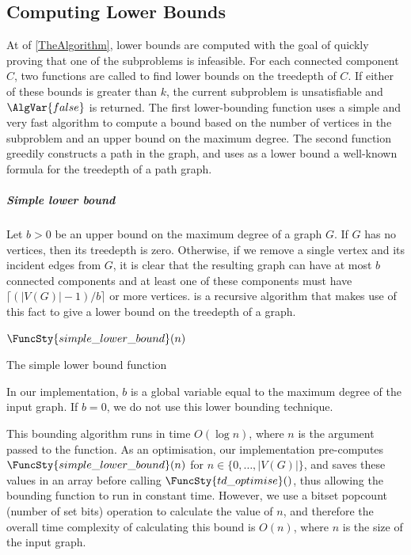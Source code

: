 {    \subsection{Computing Lower Bounds}

    At  of \cref{TheAlgorithm},
    lower bounds are computed with the goal of quickly proving that one of the
    subproblems is infeasible.  For each connected component $C$, two functions are
    called to find lower bounds on the treedepth of $C$.  If either of these bounds
    is greater than $k$, the current subproblem is unsatisfiable and
    $\AlgVar{false}$ is returned.  The first lower-bounding function uses a simple and very fast
    algorithm to compute a bound based on the number of vertices in the subproblem
    and an upper bound on the maximum degree.  The second function greedily
    constructs a path in the graph, and uses as a lower bound a well-known formula for the treedepth of a
    path graph.

    \subparagraph*{Simple lower bound}

    Let $b > 0$ be an upper bound on the maximum degree of a graph $G$.
    If $G$ has no vertices, then its treedepth is zero.  Otherwise, if we remove a single vertex and
    its incident edges from $G$, it is clear that the resulting graph can
    have at most $b$ connected components and at least one of these components must have
    $\lceil (|V(G)| - 1) / b \rceil$ or more vertices.
     is a recursive algorithm that makes use of this
    fact to give a lower bound on the treedepth of a graph.

    {
    \begin{algorithm}[htb]
     \footnotesize
    \DontPrintSemicolon
    \newcommand\SimpleLowerBound{\FuncSty{simple\_lower\_bound}}
    \nl $\SimpleLowerBound(n)$ \label{simple_lower_bound_fun} \;
    \nl \Begin{
      \nl \lIf{$n = 0$}{\KwSty{return} $0$}
      \nl \KwSty{return} $1 + \SimpleLowerBound(\lceil (n - 1) / b \rceil )$ \;
    }
    \caption{The simple lower bound function}
    \label{SimpleLowerBoundAlgorithm}
    \end{algorithm}
    }

    In our implementation, $b$ is a global variable equal to the maximum degree of the
    input graph.  If $b = 0$, we do not use this lower bounding technique.

    This bounding algorithm runs in time $O(\log n)$, where $n$ is the argument passed
    to the function.
    As an optimisation, our implementation pre-computes $\FuncSty{simple\_lower\_bound}(n)$
    for $n \in \{0, \dots, |V(G)|\}$, and saves these values in an array before calling
    $\FuncSty{td\_optimise}()$, thus allowing the bounding function to run in constant time.
    However, we use a bitset popcount (number of set bits) operation to calculate the value of $n$, and therefore
    the overall time complexity of calculating this bound is $O(n)$, where $n$ is the size
    of the input graph.

}
